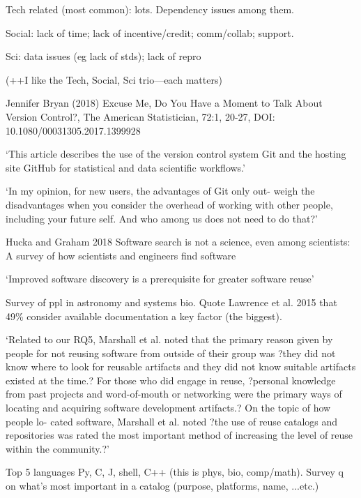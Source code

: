 \documentclass[12pt]{amsart}
\begin{document}
Tech related (most common): lots. Dependency issues among them.

Social: lack of time; lack of incentive/credit; comm/collab; support. 

Sci: data issues (eg lack of stds); lack of repro

(++I like the Tech, Social, Sci trio---each matters)



Jennifer Bryan (2018) Excuse Me, Do You Have a Moment to Talk About
Version Control?, The American Statistician, 72:1, 20-27, DOI: 10.1080/00031305.2017.1399928

`This article describes the use of the version control system Git and the hosting site GitHub for statistical and data scientific workflows.'

`In my opinion, for new users, the advantages of Git only out- weigh the disadvantages when you consider the overhead of working with other people, including your future self. And who among us does not need to do that?'





Hucka and Graham 2018 Software search is not a science, even among scientists: A survey of how scientists and engineers find software

`Improved software discovery is a prerequisite for greater software reuse'

Survey of ppl in astronomy and systems bio. Quote Lawrence et al. 2015 that 49\% consider available documentation a key factor (the biggest).

`Related to our RQ5, Marshall et al. noted that the primary reason given by people for not reusing software from outside of their group was ?they did not know where to look for reusable artifacts and they did not know suitable artifacts existed at the time.? For those who did engage in reuse, ?personal knowledge from past projects and word-of-mouth or networking were the primary ways of locating and acquiring software development artifacts.? On the topic of how people lo- cated software, Marshall et al. noted ?the use of reuse catalogs and repositories was rated the most important method of increasing the level of reuse within the community.?'

Top 5 languages Py, C, J, shell, C++ (this is phys, bio, comp/math). Survey q on what's most important in a catalog (purpose, platforms, name, ...etc.)
\end{document}
